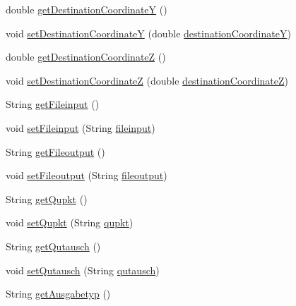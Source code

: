 \begin{DoxyCompactItemize}
\item 
double \hyperlink{classparams_1_1_control_parms_a055cab8e112537f78077721cc08d1180}{get\+Destination\+CoordinateY} ()
\item 
void \hyperlink{classparams_1_1_control_parms_abb6dad3385885ee866020022ea8a2686}{set\+Destination\+CoordinateY} (double \hyperlink{classparams_1_1_control_parms_a90bb6214dd6ee9d4f02aa7cf58d915bb}{destination\+CoordinateY})
\item 
double \hyperlink{classparams_1_1_control_parms_a495fb5cc9b4a503506b684a699ecb625}{get\+Destination\+CoordinateZ} ()
\item 
void \hyperlink{classparams_1_1_control_parms_a803ea3480b1a8b08dd39b43911e4c649}{set\+Destination\+CoordinateZ} (double \hyperlink{classparams_1_1_control_parms_a08120c4eed68ad7702c1916abaaa16db}{destination\+CoordinateZ})
\item 
String \hyperlink{classparams_1_1_control_parms_aad161acbe2c3e412ad077e3319c914cf}{get\+Fileinput} ()
\item 
void \hyperlink{classparams_1_1_control_parms_a609480f3c26381da7f897c481a7f684c}{set\+Fileinput} (String \hyperlink{classparams_1_1_control_parms_a8f7f249d73a5315f42f96ad5e844714e}{fileinput})
\item 
String \hyperlink{classparams_1_1_control_parms_ac022aba6ce9fc9cc2db653d4b33cf30c}{get\+Fileoutput} ()
\item 
void \hyperlink{classparams_1_1_control_parms_acb93361691fe1af23a8d840629f5f796}{set\+Fileoutput} (String \hyperlink{classparams_1_1_control_parms_a46c822bd308f3cf5593519a9b1421a07}{fileoutput})
\item 
String \hyperlink{classparams_1_1_control_parms_af6ac66a15401db24a578c5ad863df54e}{get\+Qupkt} ()
\item 
void \hyperlink{classparams_1_1_control_parms_a80c2c269b374d89c053bfd4ec569bc0d}{set\+Qupkt} (String \hyperlink{classparams_1_1_control_parms_a289a0ed91250fd5f28210158775de95c}{qupkt})
\item 
String \hyperlink{classparams_1_1_control_parms_a8700a8ee5b82ed97b607ee070596ad4c}{get\+Qutausch} ()
\item 
void \hyperlink{classparams_1_1_control_parms_a2a551f64ac811a40f1a1fef83793f94d}{set\+Qutausch} (String \hyperlink{classparams_1_1_control_parms_a8ede5bb2ec22052831dcac27853ef668}{qutausch})
\item 
String \hyperlink{classparams_1_1_control_parms_a310f3b5a8fa32f4810cebe7354d8b6fb}{get\+Ausgabetyp} ()
\item 

\end{DoxyCompactItemize}
